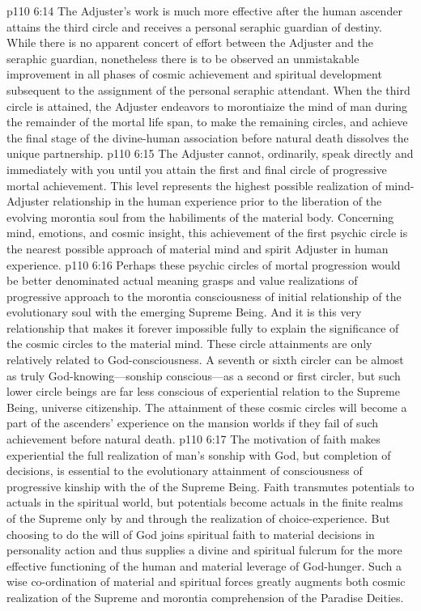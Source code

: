 \pc \vs p110 6:14  The Adjuster’s work is much more effective after the human ascender attains the third circle and receives a personal seraphic guardian of destiny. While there is no apparent concert of effort between the Adjuster and the seraphic guardian, nonetheless there is to be observed an unmistakable improvement in all phases of cosmic achievement and spiritual development subsequent to the assignment of the personal seraphic attendant. When the third circle is attained, the Adjuster endeavors to morontiaize the mind of man during the remainder of the mortal life span, to make the remaining circles, and achieve the final stage of the divine\hyp{}human association before natural death dissolves the unique partnership.
\pc \vs p110 6:15  The Adjuster cannot, ordinarily, speak directly and immediately with you until you attain the first and final circle of progressive mortal achievement. This level represents the highest possible realization of mind\hyp{}Adjuster relationship in the human experience prior to the liberation of the evolving morontia soul from the habiliments of the material body. Concerning mind, emotions, and cosmic insight, this achievement of the first psychic circle is the nearest possible approach of material mind and spirit Adjuster in human experience.
\pc \vs p110 6:16 Perhaps these psychic circles of mortal progression would be better denominated actual meaning grasps and value realizations of progressive approach to the morontia consciousness of initial relationship of the evolutionary soul with the emerging Supreme Being. And it is this very relationship that makes it forever impossible fully to explain the significance of the cosmic circles to the material mind. These circle attainments are only relatively related to God\hyp{}consciousness. A seventh or sixth circler can be almost as truly God\hyp{}knowing---sonship conscious---as a second or first circler, but such lower circle beings are far less conscious of experiential relation to the Supreme Being, universe citizenship. The attainment of these cosmic circles will become a part of the ascenders’ experience on the mansion worlds if they fail of such achievement before natural death.
\vs p110 6:17 The motivation of faith makes experiential the full realization of man’s sonship with God, but  completion of decisions, is essential to the evolutionary attainment of consciousness of progressive kinship with the  of the Supreme Being. Faith transmutes potentials to actuals in the spiritual world, but potentials become actuals in the finite realms of the Supreme only by and through the realization of choice\hyp{}experience. But choosing to do the will of God joins spiritual faith to material decisions in personality action and thus supplies a divine and spiritual fulcrum for the more effective functioning of the human and material leverage of God\hyp{}hunger. Such a wise co\hyp{}ordination of material and spiritual forces greatly augments both cosmic realization of the Supreme and morontia comprehension of the Paradise Deities.
